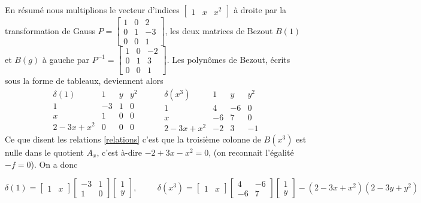 \documentclass{standalone}
\begin{document}
  En résumé nous multiplions le vecteur d'indices
  $\begin{bmatrix}
  	1 & x & x^2
  \end{bmatrix}$ à droite par la transformation de Gauss
  $P =
  \begin{bmatrix}
  	1 & 0 & 2 \\
  	0 & 1 & -3 \\
  	0 & 0 & 1
  \end{bmatrix}$, les deux matrices de Bezout $B(1)$ et $B(g)$ à gauche par
  $P^{-1} =
  \begin{bmatrix}
  	1 & 0 & -2 \\
  	0 & 1 & 3 \\
  	0 & 0 & 1
  \end{bmatrix}$. Les polynômes de Bezout, écrits sous la forme de tableaux, deviennent alors
  $$
  \begin{array}{c|ccc}
  	\delta(1) & 1 & y & y^2\\
  	\hline
  	1 & -3 & 1 & 0\\
  	x & 1 & 0 & 0\\
  	2 - 3x + x^2 & 0 & 0 & 0
  \end{array}
  \hspace{1cm}
  \begin{array}{c|ccc}
  	\delta(x^3) & 1 & y & y^2\\
  	\hline
  	1 & 4 & -6 & 0 \\
  	x & -6 & 7 & 0 \\
  	2 - 3x + x^2 & -2 & 3 & -1
  \end{array}
  $$
  Ce que disent les relations \ref{relations} c'est que la troisième colonne de $B(x^3)$ est nulle dans le quotient $A_x$, c'est à-dire $-2 + 3x - x^2 = 0$, (on reconnait l'égalité $-f = 0$). On a donc

  $$
  \delta(1) = \begin{bmatrix}
  	1 & x
  \end{bmatrix}
  \begin{bmatrix}
  	-3 & 1 \\
  	1 & 0
  \end{bmatrix}
  \begin{bmatrix}
  	1 \\
  	y
  \end{bmatrix},
  \hspace{1cm}
  \delta(x^3) = \begin{bmatrix}
  	1 & x
  \end{bmatrix}
  \begin{bmatrix}
  	4 & -6 \\
  	-6 & 7
  \end{bmatrix}
  \begin{bmatrix}
  	1 \\
  	y
  \end{bmatrix} - (2 - 3x + x^2)(2 - 3y + y^2)
  $$
\end{document}
